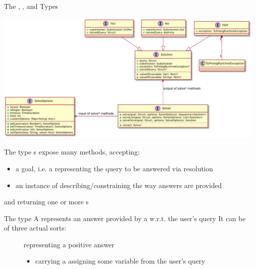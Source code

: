 \documentclass[handout]{beamer}
\begin{document}
\begin{frame}[allowframebreaks]{The , , and  Types}




    \begin{center}
        \includegraphics[width=\linewidth]{img/solve-io.pdf}
    \end{center}

    \begin{block}{The  type}
        s expose many  methods, accepting:
        \begin{itemize}
            \item a \alert{goal}, i.e. a  representing the query to be answered via resolution
            \item an instance of  describing/constraining the way answers are provided
        \end{itemize}
        and returning one or more s 
    \end{block}

    \begin{block}{The  type}
        A  represents an answer provided by a  w.r.t. the user's query
        It can be of three actual sorts:
        \begin{description}
            \item[] representing a positive answer
            \begin{itemize}\small
                \item carrying a  assigning some variable from the user's query
            \end{itemize} 


\end{description}
\end{block}
\end{frame}
\end{document}
